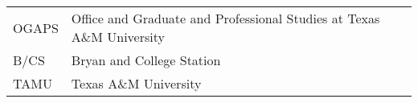 \TAMUNomenclatureFormat

	\begin{table}[htbp]
	    \begin{tabular}{@{}p{} p{}@{}}
		OGAPS	&	Office and Graduate and Professional Studies at Texas A\&M University\\	[2ex]
		B/CS		&	Bryan and College Station\\	[2ex] %
		TAMU			&	Texas A\&M University\\	[2ex]
	    \end{tabular}%
	\end{table}


